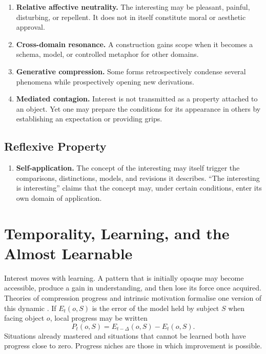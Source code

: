 \documentclass[11pt,a4paper]{article}
\begin{document}
\begin{enumerate}[resume]
  \item \textbf{Relative affective neutrality.} The interesting may be
        pleasant, painful, disturbing, or repellent. It does not in itself
        constitute moral or aesthetic approval.
  \item \textbf{Cross-domain resonance.} A construction gains scope when it
        becomes a schema, model, or controlled metaphor for other domains.
  \item \textbf{Generative compression.} Some forms retrospectively condense
        several phenomena while prospectively opening new derivations.
  \item \textbf{Mediated contagion.} Interest is not transmitted as a property
        attached to an object. Yet one may prepare the conditions for its
        appearance in others by establishing an expectation or providing
        grips.
\end{enumerate}

\subsection{Reflexive Property}

\begin{enumerate}[resume]
  \item \textbf{Self-application.} The concept of the interesting may itself
        trigger the comparisons, distinctions, models, and revisions it
        describes. ``The interesting is interesting'' claims that the concept
        may, under certain conditions, enter its own domain of application.
\end{enumerate}

\section{Temporality, Learning, and the Almost Learnable}

Interest moves with learning. A pattern that is initially opaque may become
accessible, produce a gain in understanding, and then lose its force once
acquired. Theories of compression progress and intrinsic motivation formalise
one version of this dynamic
\parencite{schmidhuber1997interesting,schmidhuber2009compression,oudeyer2007intrinsic,oudeyer2007typology}.
If \(E_t(o,S)\) is the error of the model held by subject \(S\) when facing
object \(o\), local progress may be written
\[
  P_t(o,S)=E_{t-\Delta}(o,S)-E_t(o,S).
\]
Situations already mastered and situations that cannot be learned both have
progress close to zero. Progress niches are those in which improvement is
possible.
\end{document}
